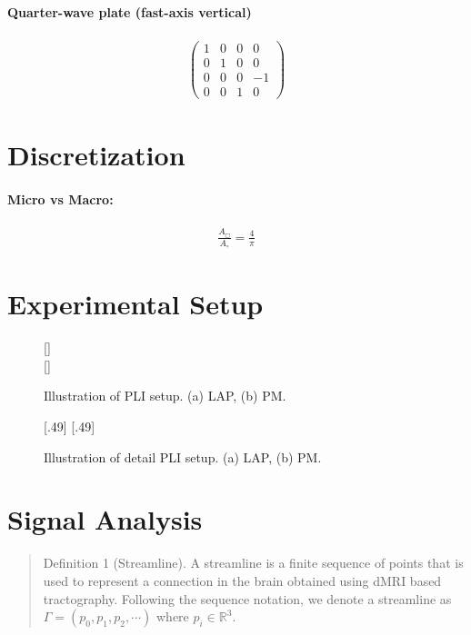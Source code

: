 \paragraph{Quarter-wave plate (fast-axis vertical)}
\begin{align}
\begin{pmatrix}
    1 & 0 & 0 &  0 \\
    0 & 1 & 0 &  0 \\
    0 & 0 & 0 & -1 \\
    0 & 0 & 1 &  0
\end{pmatrix}
\end{align}
% 
% 
\section{Discretization}
\paragraph{Micro vs Macro:}
% 
\begin{align}
    \frac{A_{\Box}}{A_{\circ}} = \frac{4}{\pi}
\end{align}
% 
\section{Experimental Setup}
%
\begin{figure}[!t]
    \captionsetup[sub]{position=top}
    \def\tikzwidth{\textwidth}
	\centering
	\subcaptionbox{}[\textwidth]{
	}\\
	\subcaptionbox{}[\textwidth]{
	}
	\label{fig:pli_setup}
	\caption{Illustration of PLI setup. (a) LAP, (b) PM.}
\end{figure}
%
\begin{figure}[!t]
\def\tikzwidth{0.49*\textwidth}
	\centering
	\subcaptionbox{}[.49\textwidth]{
			}
	\subcaptionbox{}[.49\textwidth]{
			}
	\label{fig:pli_detail}
	\caption{Illustration of detail PLI setup. (a) LAP, (b) PM.}
\end{figure}
%
% 
\section{Signal Analysis}
% 
\begin{quote}
Definition 1 (Streamline).
A streamline is a finite sequence of points that is used to represent a connection in the brain obtained using dMRI based tractography.
Following the sequence notation, we denote a streamline as $\Gamma = (p_0, p_1, p_2, \cdots )$ where $p_i \in \mathbb{R}^3$. %
\end{quote}

